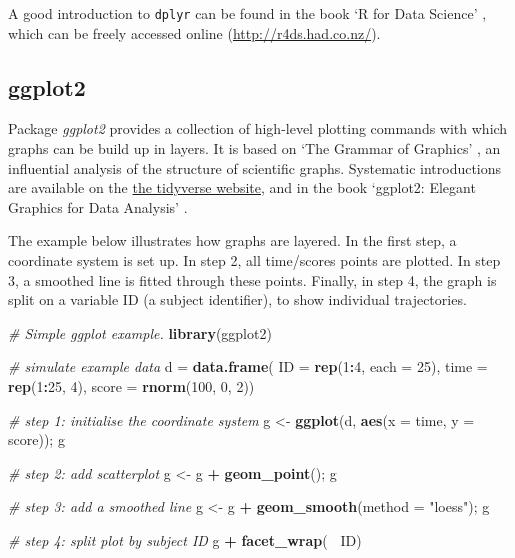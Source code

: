 \documentclass[]{book}
\newenvironment{Shaded}{\begin{snugshade}}{\end{snugshade}}
\newcommand{\KeywordTok}[1]{\textcolor[rgb]{0.13,0.29,0.53}{\textbf{#1}}}
\newcommand{\DataTypeTok}[1]{\textcolor[rgb]{0.13,0.29,0.53}{#1}}
\newcommand{\DecValTok}[1]{\textcolor[rgb]{0.00,0.00,0.81}{#1}}
\newcommand{\StringTok}[1]{\textcolor[rgb]{0.31,0.60,0.02}{#1}}
\newcommand{\CommentTok}[1]{\textcolor[rgb]{0.56,0.35,0.01}{\textit{#1}}}
\newcommand{\OperatorTok}[1]{\textcolor[rgb]{0.81,0.36,0.00}{\textbf{#1}}}
\newcommand{\NormalTok}[1]{#1}
\begin{document}
A good introduction to \texttt{dplyr} can be found in the book `R for
Data Science' \citep{wickham2016r}, which can be freely accessed online
(\url{http://r4ds.had.co.nz/}).

\subsection{ggplot2}\label{ggplot2}


Package \emph{ggplot2} \citep{wickham2016ggplot2} provides a collection
of high-level plotting commands with which graphs can be build up in
layers. It is based on `The Grammar of Graphics' \citep{wilkinson2006},
an influential analysis of the structure of scientific graphs.
Systematic introductions are available on the
\href{http://ggplot2.tidyverse.org/}{the tidyverse website}, and in the
book `ggplot2: Elegant Graphics for Data Analysis'
\citep{wickham2016ggplot2}.

The example below illustrates how graphs are layered. In the first step,
a coordinate system is set up. In step 2, all time/scores points are
plotted. In step 3, a smoothed line is fitted through these points.
Finally, in step 4, the graph is split on a variable ID (a subject
identifier), to show individual trajectories.

\begin{Shaded}
\begin{Highlighting}[]
\CommentTok{# Simple ggplot example.}
\KeywordTok{library}\NormalTok{(ggplot2)}

\CommentTok{# simulate example data }
\NormalTok{d =}\StringTok{ }\KeywordTok{data.frame}\NormalTok{(}
  \DataTypeTok{ID    =} \KeywordTok{rep}\NormalTok{(}\DecValTok{1}\OperatorTok{:}\DecValTok{4}\NormalTok{, }\DataTypeTok{each =} \DecValTok{25}\NormalTok{),}
  \DataTypeTok{time  =} \KeywordTok{rep}\NormalTok{(}\DecValTok{1}\OperatorTok{:}\DecValTok{25}\NormalTok{, }\DecValTok{4}\NormalTok{), }
  \DataTypeTok{score =} \KeywordTok{rnorm}\NormalTok{(}\DecValTok{100}\NormalTok{, }\DecValTok{0}\NormalTok{, }\DecValTok{2}\NormalTok{))}

\CommentTok{# step 1: initialise the coordinate system}
\NormalTok{g <-}\StringTok{ }\KeywordTok{ggplot}\NormalTok{(d, }\KeywordTok{aes}\NormalTok{(}\DataTypeTok{x =}\NormalTok{ time, }\DataTypeTok{y =}\NormalTok{ score)); g}

\CommentTok{# step 2: add scatterplot}
\NormalTok{g <-}\StringTok{ }\NormalTok{g }\OperatorTok{+}\StringTok{ }\KeywordTok{geom_point}\NormalTok{(); g}

\CommentTok{# step 3: add a smoothed line}
\NormalTok{g <-}\StringTok{ }\NormalTok{g }\OperatorTok{+}\StringTok{ }\KeywordTok{geom_smooth}\NormalTok{(}\DataTypeTok{method =} \StringTok{"loess"}\NormalTok{); g}

\CommentTok{# step 4: split plot by subject ID}
\NormalTok{g }\OperatorTok{+}\StringTok{ }\KeywordTok{facet_wrap}\NormalTok{(}\OperatorTok{~}\StringTok{ }\NormalTok{ID)}
\end{Highlighting}
\end{Shaded}
\end{document}
